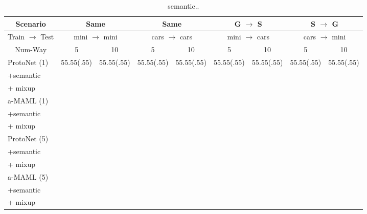 \documentclass[letterpaper]{article} %
\begin{document}
{\renewcommand{\arraystretch}{1} %
\begin{table}[t]
\centering
\caption{semantic fixed}
\label{table:fixedsemantic}
\end{table}
\begin{table}[]
\caption{semantic..}
\begin{tabular}{l|cc|cc|cc|cc}
\multicolumn{1}{c|}{Scenario} & 
  \multicolumn{2}{c|}{Same} &
  \multicolumn{2}{c|}{Same} &
  \multicolumn{2}{c|}{G $\rightarrow$ S} &
  \multicolumn{2}{c}{S $\rightarrow$ G} \\ \hline
\multicolumn{1}{c|}{Train $\rightarrow$ Test} &
  \multicolumn{2}{c|}{mini $\rightarrow$ mini} &
  \multicolumn{2}{c|}{cars $\rightarrow$ cars} &
  \multicolumn{2}{c|}{mini $\rightarrow$ cars} &
  \multicolumn{2}{c}{cars $\rightarrow$ mini} \\ \hline
\multicolumn{1}{c|}{Num-Way}      & 5 & 10 & 5 & 10 & 5 & 10 & 5 & 10 \\ \hline
ProtoNet (1) & 55.55(.55)  &  55.55(.55)  & 55.55(.55)  &  55.55(.55)  &  55.55(.55) &  55.55(.55)  &55.55(.55)   & 55.55(.55)   \\
+semantic    &   &    &   &    &   &    &   &    \\
+ mixup      &   &    &   &    &   &    &   &    \\ \hline
a-MAML (1)   &   &    &   &    &   &    &   &    \\
+semantic    &   &    &   &    &   &    &   &    \\
+ mixup      &   &    &   &    &   &    &   &    \\ \hline
ProtoNet (5) &   &    &   &    &   &    &   &    \\
+semantic    &   &    &   &    &   &    &   &    \\
+ mixup      &   &    &   &    &   &    &   &    \\ \hline
a-MAML (5)   &   &    &   &    &   &    &   &    \\
+semantic    &   &    &   &    &   &    &   &    \\
+ mixup      &   &    &   &    &   &    &   &   
\end{tabular}
\label{table:anysemantic}
\end{table}

}
\end{document}
